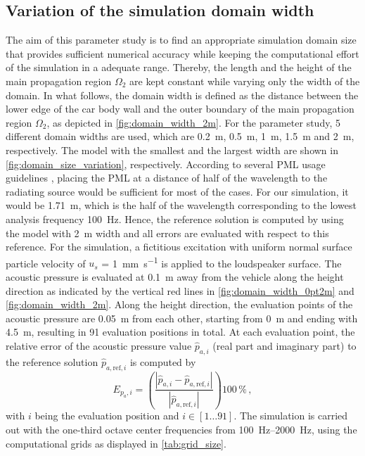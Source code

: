 \subsection*{Variation of the simulation domain width}
The aim of this parameter study is to find an appropriate simulation domain size that provides sufficient numerical accuracy while keeping the computational effort of the simulation in a adequate range. 
Thereby, the length and the height of the main propagation region $\Omega_2$ are kept constant while varying only the width of the domain. 
In what follows, the domain width is defined as the distance between the lower edge of the car body wall and the outer boundary of the main propagation region $\Omega_2$, as depicted in \cref{fig:domain_width_2m}. For the parameter study, 5 different domain widths are used, which are \SI{0.2}{\meter}, \SI{0.5}{\meter}, \SI{1}{\meter}, \SI{1.5}{\meter} and \SI{2}{\meter}, respectively. The model with the smallest and the largest width are shown in \cref{fig:domain_size_variation}, respectively. 
According to several PML usage guidelines \cite{PML_3ds, PML_comsol, PML_quickwave}, placing the PML at a distance of half of the wavelength to the radiating source would be sufficient for most of the cases. 
For our simulation, it would be \SI{1.71}{\meter}, which is the half of the wavelength corresponding to the lowest analysis frequency \SI{100}{\hertz}.
Hence, the reference solution is computed by using the model with \SI{2}{\meter} width and all errors are evaluated with respect to this reference. For the simulation, a fictitious excitation with uniform normal surface particle velocity of $u_s$ = \SI{1}{\milli\meter\per\second} is applied to the loudspeaker surface. 
The acoustic pressure is evaluated at \SI{0.1}{\meter} away from the vehicle along the height direction as indicated by the vertical red lines in \cref{fig:domain_width_0pt2m} and \cref{fig:domain_width_2m}. Along the height direction, the evaluation points of the acoustic pressure are \SI{0.05}{\meter} from each other, starting from \SI{0}{\meter} and ending with \SI{4.5}{\meter}, resulting in 91 evaluation positions in total. At each evaluation point, the relative error of the acoustic pressure value $\hat{p}_{a,i}$ (real part and imaginary part) to the reference solution $\hat{p}_{a,\text{ref},i}$ is computed by
\begin{equation}
	E_{p_a,i} = \left(\frac{\left| \hat{p}_{a,i} - \hat{p}_{a,\text{ref},i} \right|}{\left|\hat{p}_{a,\text{ref},i}\right|}\right)100\,\% \,,
\end{equation}
with $i$ being the evaluation position and $i \in \left[1\dots91\right]$. The simulation is carried out with the one-third octave center frequencies from \SIrange{100}{2000}{\hertz}, using the computational grids as displayed in \cref{tab:grid_size}.

